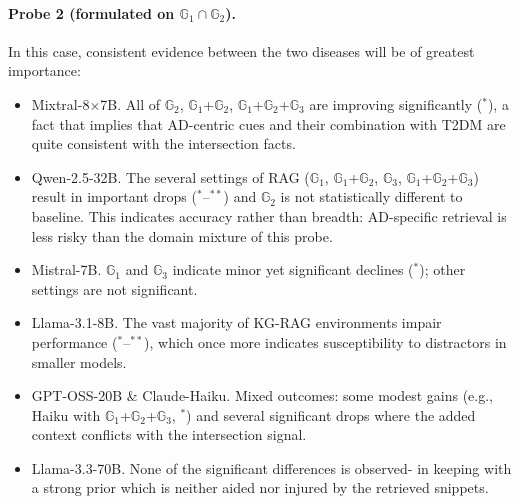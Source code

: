 \paragraph{Probe 2 (formulated on $\mathbb{G}_1\cap \mathbb{G}_2$).}
In this case, consistent evidence between the two diseases will be of greatest importance:
\begin{itemize}
  \item Mixtral-8$\times$7B. All of $\mathbb{G}_2$, $\mathbb{G}_1$+$\mathbb{G}_2$, $\mathbb{G}_1$+$\mathbb{G}_2$+$\mathbb{G}_3$ are improving significantly ($^{*}$), a fact that implies that AD-centric cues and their combination with T2DM are quite consistent with the intersection facts.
  \item Qwen-2.5-32B. The several settings of RAG ($\mathbb{G}_1$, $\mathbb{G}_1$+$\mathbb{G}_2$, $\mathbb{G}_3$, $\mathbb{G}_1$+$\mathbb{G}_2$+$\mathbb{G}_3$) result in important drops ($^{*}$–$^{**}$) and $\mathbb{G}_2$ is not statistically different to baseline. This indicates accuracy rather than breadth: AD-specific retrieval is less risky than the domain mixture of this probe.
  \item Mistral-7B. $\mathbb{G}_1$ and $\mathbb{G}_3$ indicate minor yet significant declines ($^{*}$); other settings are not significant.
  \item Llama-3.1-8B. The vast majority of KG-RAG environments impair performance ($^{*}$–$^{**}$), which once more indicates susceptibility to distractors in smaller models.
  \item GPT-OSS-20B \& Claude-Haiku. Mixed outcomes: some modest gains (e.g., Haiku with $\mathbb{G}_1$+$\mathbb{G}_2$+$\mathbb{G}_3$, $^{*}$) and several significant drops where the added context conflicts with the intersection signal.
  \item Llama-3.3-70B. None of the significant differences is observed- in keeping with a strong prior which is neither aided nor injured by the retrieved snippets.
\end{itemize}

